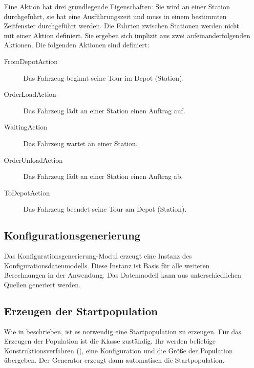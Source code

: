 Eine Aktion hat drei grundlegende Eigenschaften: Sie wird an einer Station durchgeführt, sie hat eine Ausführungszeit und muss in einem bestimmten Zeitfenster durchgeführt werden. Die Fahrten zwischen Stationen werden nicht mit einer Aktion definiert. Sie ergeben sich implizit aus zwei aufeinanderfolgenden Aktionen. Die folgenden Aktionen sind definiert:
\begin{description}
 \item[FromDepotAction] Das Fahrzeug beginnt seine Tour im Depot (Station). 
 \item[OrderLoadAction] Das Fahrzeug lädt an einer Station einen Auftrag auf.
 \item[WaitingAction] Das Fahrzeug wartet an einer Station.
 \item[OrderUnloadAction] Das Fahrzeug lädt an einer Station einen Auftrag ab.
 \item[ToDepotAction] Das Fahrzeug beendet seine Tour am Depot (Station).
\end{description}


\FloatBarrier
\subsection{Konfigurationsgenerierung}
Das Konfigurationsgenerierung-Modul erzeugt eine Instanz des Konfigurationsdatenmodells. Diese Instanz ist Basis für alle weiteren Berechnungen in der Anwendung. Das Datenmodell kann aus unterschiedlichen Quellen generiert werden. 

\subsection{Erzeugen der Startpopulation}
Wie in  beschrieben, ist es notwendig eine Startpopulation zu erzeugen. Für das Erzeugen der Population ist die Klasse  zuständig. Ihr werden beliebige Konstruktionsverfahren (), eine Konfiguration und die Größe der Population übergeben. Der Generator erzeugt dann automatisch die Startpopulation.

